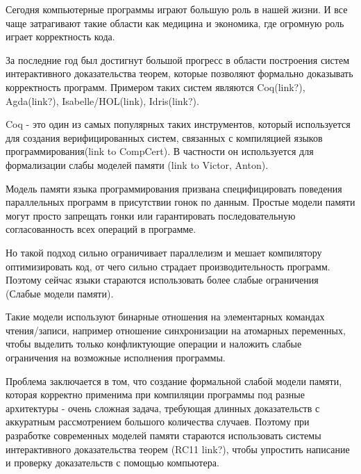 \documentclass[times
              ]{itmo-student-thesis}
\begin{document}

\tableofcontents

\startprefacepage



Сегодня компьютерные программы играют большую роль в нашей жизни. И все чаще затрагивают такие области как медицина и экономика, где огромную роль играет корректность кода.

За последние год был достигнут большой прогресс в области построения систем интерактивного доказательства теорем, которые позволяют формально доказывать корректность программ. Примером таких систем являются Coq(link?), Agda(link?), Isabelle/HOL(link), Idris(link?).

Coq - это один из самых популярных таких инструментов, который используется для создания верифицированных систем, связанных с компиляцией языков программирования(link to CompCert). В частности он используется для формализации слабы моделей памяти (link to Victor, Anton).

Модель памяти языка программирования призвана специфицировать поведения параллельных программ в присутствии гонок по данным. Простые модели памяти могут просто запрещать гонки или гарантировать последовательную согласованность всех операций в программе.

Но такой подход сильно ограничивает параллелизм и мешает компилятору оптимизировать код, от чего сильно страдает производительность программ. Поэтому сейчас языки стараются использовать более слабые ограничения (Слабые модели памяти).

Такие модели используют бинарные отношения на элементарных командах чтения/записи, например отношение синхронизации на атомарных переменных, чтобы выделить только конфликтующие операции и наложить слабые ограничения на возможные исполнения программы.

Проблема заключается в том, что создание формальной слабой модели памяти, которая корректно применима при компиляции программы под разные архитектуры - очень сложная задача, требующая длинных доказательств с аккуратным рассмотрением большого количества случаев.
Поэтому при разработке современных моделей памяти стараются использовать системы интерактивного доказательства теорем (RC11 link?), чтобы упростить написание и проверку доказательств с помощью компьютера.
\end{document}
